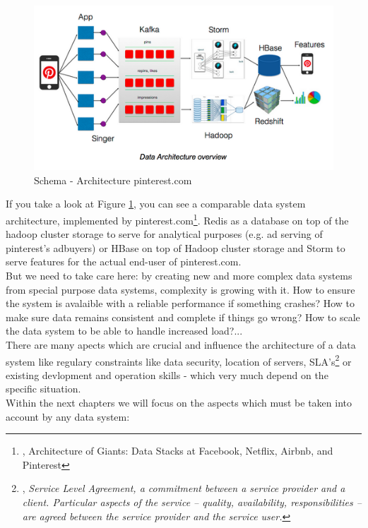 \begin{figure}[ht]
	\centering
  \includegraphics[width=1\textwidth]{pinterest_architecture.png}
	\caption{Schema - Architecture pinterest.com}
	\label{schema_pinterest_architecture}
\end{figure}
If you take a look at Figure \ref{schema_pinterest_architecture}, you can see a comparable data system architecture, implemented by pinterest.com\footnote{\cite{PINA}, Architecture of Giants: Data Stacks at Facebook, Netflix, Airbnb, and Pinterest}. Redis as a database on top of the hadoop cluster storage to serve for analytical purposes (e.g. ad serving of pinterest's adbuyers) or HBase on top of Hadoop cluster storage and Storm to serve features for the actual end-user of pinterest.com.\\

But we need to take care here: by creating new and more complex data systems from special purpose data systems, complexity is growing with it. How to ensure the system is avalaible with a reliable performance if something crashes? How to make sure data remains consistent and complete if things go wrong? How to scale the data system to be able to handle increased load?...\\
There are many apects which are crucial and influence the architecture of a data system like regulary constraints like data security, location of servers, SLA's\footnote{\cite{WKSLA}, \textit{Service Level Agreement, a commitment between a service provider and a client. Particular aspects of the service – quality, availability, responsibilities – are agreed between the service provider and the service user.}} or existing devlopment and operation skills - which very much depend on the specific situation.\\
Within the next chapters we will focus on the aspects which must be taken into account by any data system:

